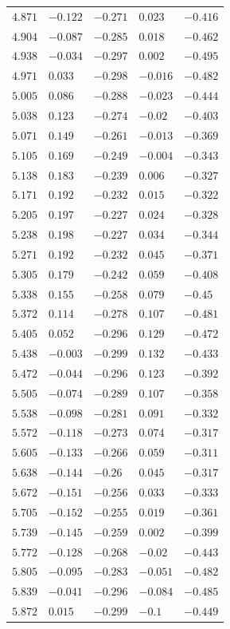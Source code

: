 \begin{center}
\begin{longtable}{lllll}
$4.871$&$-0.122$&$-0.271$&$0.023$&$-0.416$\\
$4.904$&$-0.087$&$-0.285$&$0.018$&$-0.462$\\
$4.938$&$-0.034$&$-0.297$&$0.002$&$-0.495$\\
$4.971$&$0.033$&$-0.298$&$-0.016$&$-0.482$\\
$5.005$&$0.086$&$-0.288$&$-0.023$&$-0.444$\\
$5.038$&$0.123$&$-0.274$&$-0.02$&$-0.403$\\
$5.071$&$0.149$&$-0.261$&$-0.013$&$-0.369$\\
$5.105$&$0.169$&$-0.249$&$-0.004$&$-0.343$\\
$5.138$&$0.183$&$-0.239$&$0.006$&$-0.327$\\
$5.171$&$0.192$&$-0.232$&$0.015$&$-0.322$\\
$5.205$&$0.197$&$-0.227$&$0.024$&$-0.328$\\
$5.238$&$0.198$&$-0.227$&$0.034$&$-0.344$\\
$5.271$&$0.192$&$-0.232$&$0.045$&$-0.371$\\
$5.305$&$0.179$&$-0.242$&$0.059$&$-0.408$\\
$5.338$&$0.155$&$-0.258$&$0.079$&$-0.45$\\
$5.372$&$0.114$&$-0.278$&$0.107$&$-0.481$\\
$5.405$&$0.052$&$-0.296$&$0.129$&$-0.472$\\
$5.438$&$-0.003$&$-0.299$&$0.132$&$-0.433$\\
$5.472$&$-0.044$&$-0.296$&$0.123$&$-0.392$\\
$5.505$&$-0.074$&$-0.289$&$0.107$&$-0.358$\\
$5.538$&$-0.098$&$-0.281$&$0.091$&$-0.332$\\
$5.572$&$-0.118$&$-0.273$&$0.074$&$-0.317$\\
$5.605$&$-0.133$&$-0.266$&$0.059$&$-0.311$\\
$5.638$&$-0.144$&$-0.26$&$0.045$&$-0.317$\\
$5.672$&$-0.151$&$-0.256$&$0.033$&$-0.333$\\
$5.705$&$-0.152$&$-0.255$&$0.019$&$-0.361$\\
$5.739$&$-0.145$&$-0.259$&$0.002$&$-0.399$\\
$5.772$&$-0.128$&$-0.268$&$-0.02$&$-0.443$\\
$5.805$&$-0.095$&$-0.283$&$-0.051$&$-0.482$\\
$5.839$&$-0.041$&$-0.296$&$-0.084$&$-0.485$\\
$5.872$&$0.015$&$-0.299$&$-0.1$&$-0.449$\\

\end{longtable}
\end{center}
